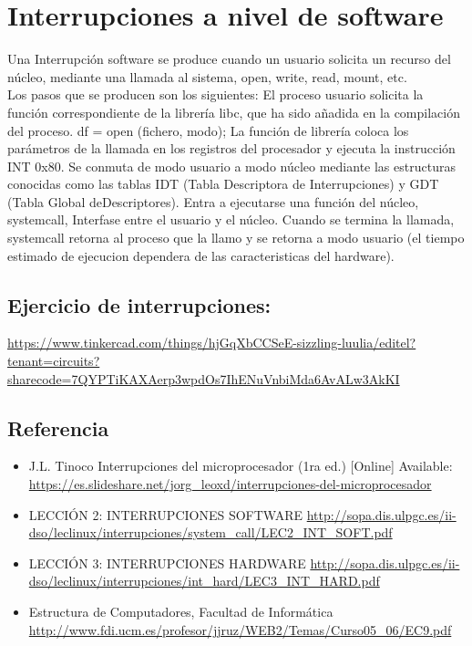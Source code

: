 \documentclass[11pt]{article}
\begin{document}
\section*{Interrupciones a nivel de software}

Una Interrupción software se produce cuando un usuario solicita un recurso del núcleo, mediante una llamada al sistema, open, write, read, mount, etc.
\\
Los pasos que se producen son los siguientes: El proceso usuario solicita la función correspondiente de la librería libc, que ha sido añadida en la compilación del proceso. df = open (fichero, modo); La función de librería coloca los parámetros de la llamada en los registros del procesador y ejecuta la instrucción INT 0x80. Se conmuta de modo usuario a modo núcleo mediante las estructuras conocidas como las tablas IDT (Tabla Descriptora de Interrupciones) y GDT (Tabla Global deDescriptores). Entra a ejecutarse una función del núcleo,  systemcall, Interfase entre el usuario y el núcleo. Cuando se termina la llamada, systemcall retorna al proceso que la llamo y se retorna a modo usuario (el tiempo estimado de ejecucion dependera de las caracteristicas del hardware).

\subsection{Ejercicio de interrupciones: }
\url{https://www.tinkercad.com/things/hjGqXbCCSeE-sizzling-luulia/editel?tenant=circuits?sharecode=7QYPTiKAXAerp3wpdOs7IhENuVnbiMda6AvALw3AkKI}
\subsection*{Referencia}
%
\begin{itemize}
    \item J.L. Tinoco Interrupciones del microprocesador  (1ra ed.) [Online] Available: \url{https://es.slideshare.net/jorg_leoxd/interrupciones-del-microprocesador}
    \item LECCIÓN 2: INTERRUPCIONES  SOFTWARE \url{http://sopa.dis.ulpgc.es/ii-dso/leclinux/interrupciones/system_call/LEC2_INT_SOFT.pdf}
    \item LECCIÓN 3: INTERRUPCIONES HARDWARE \url{http://sopa.dis.ulpgc.es/ii-dso/leclinux/interrupciones/int_hard/LEC3_INT_HARD.pdf}
    \item Estructura de Computadores, Facultad de Informática \url{http://www.fdi.ucm.es/profesor/jjruz/WEB2/Temas/Curso05_06/EC9.pdf}

\end{itemize}
\end{document}
